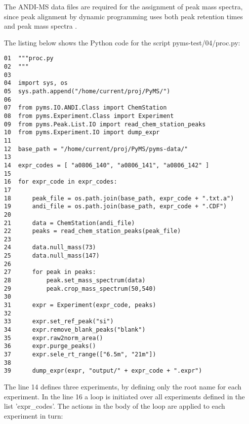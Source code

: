 The ANDI-MS data files are required for the assignment of peak mass spectra,
since peak alignment by dynamic programming uses both peak retention times
and peak mass spectra \cite{Robinson07}.

The listing below shows the Python code for the script pyms-test/04/proc.py:

\begin{verbatim}
01  """proc.py
02  """
03  
04  import sys, os
05  sys.path.append("/home/current/proj/PyMS/")
06  
07  from pyms.IO.ANDI.Class import ChemStation
08  from pyms.Experiment.Class import Experiment
09  from pyms.Peak.List.IO import read_chem_station_peaks
10  from pyms.Experiment.IO import dump_expr
11  
12  base_path = "/home/current/proj/PyMS/pyms-data/"
13  
14  expr_codes = [ "a0806_140", "a0806_141", "a0806_142" ]
15  
16  for expr_code in expr_codes:
17  
18      peak_file = os.path.join(base_path, expr_code + ".txt.a")
19      andi_file = os.path.join(base_path, expr_code + ".CDF")
20  
21      data = ChemStation(andi_file)
22      peaks = read_chem_station_peaks(peak_file)
23  
24      data.null_mass(73)
25      data.null_mass(147)
26  
27      for peak in peaks:
28          peak.set_mass_spectrum(data)
29          peak.crop_mass_spectrum(50,540)
30  
31      expr = Experiment(expr_code, peaks)
32  
33      expr.set_ref_peak("si")
34      expr.remove_blank_peaks("blank")
35      expr.raw2norm_area()
36      expr.purge_peaks()
37      expr.sele_rt_range(["6.5m", "21m"])
38  
39      dump_expr(expr, "output/" + expr_code + ".expr")
\end{verbatim}

\noindent
The line 14 defines three experiments, by defining only the root name for
each experiment. In the line 16 a loop is initiated over all experiments
defined in the list 'expr\_codes'.  The actions in the body of the loop
are applied to each experiment in turn:

